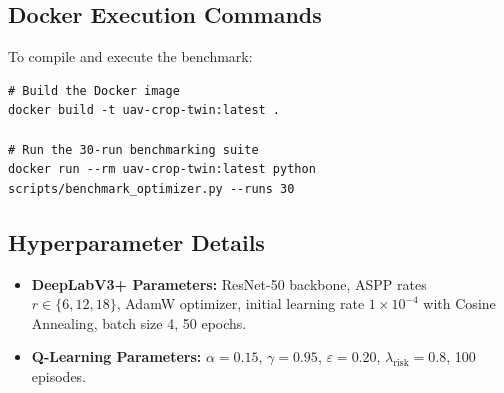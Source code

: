 \documentclass[review,3p,times,authoryear]{elsarticle}
\begin{document}
\subsection{Docker Execution Commands}
To compile and execute the benchmark:
\begin{verbatim}
# Build the Docker image
docker build -t uav-crop-twin:latest .

# Run the 30-run benchmarking suite
docker run --rm uav-crop-twin:latest python scripts/benchmark_optimizer.py --runs 30
\end{verbatim}

\subsection{Hyperparameter Details}
\begin{itemize}
    \item \textbf{DeepLabV3+ Parameters:} ResNet-50 backbone, ASPP rates $r \in \{6, 12, 18\}$, AdamW optimizer, initial learning rate $1 \times 10^{-4}$ with Cosine Annealing, batch size 4, 50 epochs.
    \item \textbf{Q-Learning Parameters:} $\alpha = 0.15$, $\gamma = 0.95$, $\varepsilon = 0.20$, $\lambda_\text{risk} = 0.8$, 100 episodes.
\end{itemize}
\end{document}
